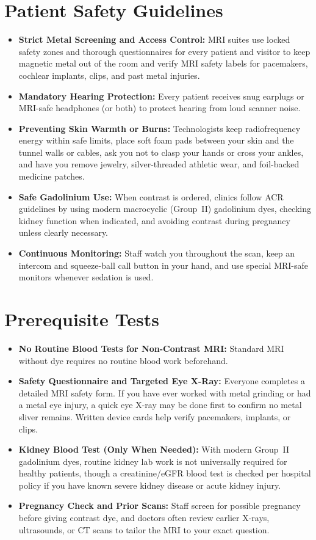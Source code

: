 \section{Patient Safety Guidelines}
\begin{itemize}
\item \textbf{Strict Metal Screening and Access Control:} MRI suites use locked safety zones and thorough questionnaires for every patient and visitor to keep magnetic metal out of the room and verify MRI safety labels for pacemakers, cochlear implants, clips, and past metal injuries.
\item \textbf{Mandatory Hearing Protection:} Every patient receives snug earplugs or MRI-safe headphones (or both) to protect hearing from loud scanner noise.
\item \textbf{Preventing Skin Warmth or Burns:} Technologists keep radiofrequency energy within safe limits, place soft foam pads between your skin and the tunnel walls or cables, ask you not to clasp your hands or cross your ankles, and have you remove jewelry, silver-threaded athletic wear, and foil-backed medicine patches.
\item \textbf{Safe Gadolinium Use:} When contrast is ordered, clinics follow ACR guidelines by using modern macrocyclic (Group~II) gadolinium dyes, checking kidney function when indicated, and avoiding contrast during pregnancy unless clearly necessary.
\item \textbf{Continuous Monitoring:} Staff watch you throughout the scan, keep an intercom and squeeze-ball call button in your hand, and use special MRI-safe monitors whenever sedation is used.
\end{itemize}

\section{Prerequisite Tests}
\begin{itemize}
\item \textbf{No Routine Blood Tests for Non-Contrast MRI:} Standard MRI without dye requires no routine blood work beforehand.
\item \textbf{Safety Questionnaire and Targeted Eye X-Ray:} Everyone completes a detailed MRI safety form. If you have ever worked with metal grinding or had a metal eye injury, a quick eye X-ray may be done first to confirm no metal sliver remains. Written device cards help verify pacemakers, implants, or clips.
\item \textbf{Kidney Blood Test (Only When Needed):} With modern Group~II gadolinium dyes, routine kidney lab work is not universally required for healthy patients, though a creatinine/eGFR blood test is checked per hospital policy if you have known severe kidney disease or acute kidney injury.
\item \textbf{Pregnancy Check and Prior Scans:} Staff screen for possible pregnancy before giving contrast dye, and doctors often review earlier X-rays, ultrasounds, or CT scans to tailor the MRI to your exact question.
\end{itemize}

